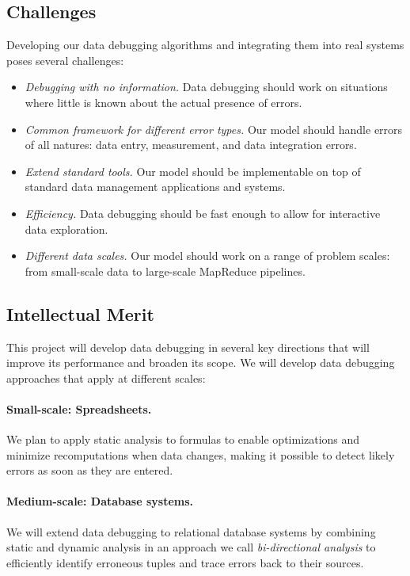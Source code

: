 \subsection{Challenges} %
\label{sub:challenges}
Developing our data debugging algorithms and integrating them into real systems poses several challenges:
\begin{itemize}
	\item \emph{Debugging with no information.} Data debugging should work on situations where little is known about the actual presence of errors.
	\item \emph{Common framework for different error types.} Our model should handle errors of all natures: data entry, measurement, and data integration errors.
	\item \emph{Extend standard tools.} Our model should be implementable on top of standard data management applications and systems.
	\item \emph{Efficiency.} Data debugging should be fast enough to allow for interactive data exploration.
	\item \emph{Different data scales.} Our model should work on a range of problem scales: from small-scale data to large-scale MapReduce pipelines.
\end{itemize}

\subsection{Intellectual Merit}

This project will develop data debugging in several key directions that will 
improve its performance and broaden its scope. We will develop
data debugging approaches that apply at different scales:

\paragraph{Small-scale: Spreadsheets.} We plan to apply static
analysis to formulas to enable optimizations and minimize
recomputations when data changes, making it possible to detect
likely errors as soon as they are entered.

\paragraph{Medium-scale: Database systems.} We will extend data debugging to
relational database systems by combining static and dynamic analysis
in an approach we call \emph{bi-directional
  analysis} to efficiently identify erroneous tuples and trace errors back to their sources.

